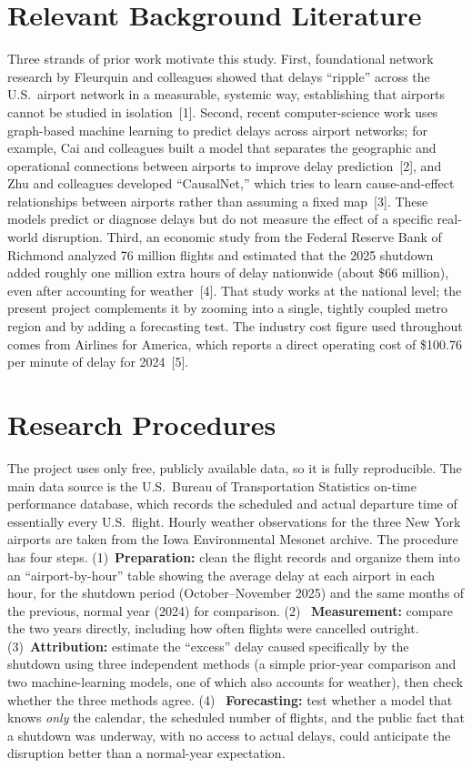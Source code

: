 \documentclass[11pt]{article}
\begin{document}
\section*{Relevant Background Literature}
Three strands of prior work motivate this study. First, foundational network
research by Fleurquin and colleagues showed that delays ``ripple'' across the
U.S.\ airport network in a measurable, systemic way, establishing that airports
cannot be studied in isolation~[1]. Second, recent computer-science work uses
graph-based machine learning to predict delays across airport networks; for
example, Cai and colleagues built a model that separates the geographic and
operational connections between airports to improve delay prediction~[2], and
Zhu and colleagues developed ``CausalNet,'' which tries to learn cause-and-effect
relationships between airports rather than assuming a fixed map~[3]. These models
predict or diagnose delays but do not measure the effect of a specific real-world
disruption. Third, an economic study from the Federal Reserve Bank of Richmond
analyzed 76 million flights and estimated that the 2025 shutdown added roughly
one million extra hours of delay nationwide (about \$66 million), even after
accounting for weather~[4]. That study works at the national level; the present
project complements it by zooming into a single, tightly coupled metro region and
by adding a forecasting test. The industry cost figure used throughout comes from
Airlines for America, which reports a direct operating cost of \$100.76 per
minute of delay for 2024~[5].

\section*{Research Procedures}
The project uses only free, publicly available data, so it is fully reproducible.
The main data source is the U.S.\ Bureau of Transportation Statistics on-time
performance database, which records the scheduled and actual departure time of
essentially every U.S.\ flight. Hourly weather observations for the three New
York airports are taken from the Iowa Environmental Mesonet archive. The
procedure has four steps. (1)~\textbf{Preparation:} clean the flight records and
organize them into an ``airport-by-hour'' table showing the average delay at each
airport in each hour, for the shutdown period (October--November 2025) and the
same months of the previous, normal year (2024) for comparison. (2)~\textbf{
Measurement:} compare the two years directly, including how often flights were
cancelled outright. (3)~\textbf{Attribution:} estimate the ``excess'' delay
caused specifically by the shutdown using three independent methods (a simple
prior-year comparison and two machine-learning models, one of which also accounts
for weather), then check whether the three methods agree. (4)~\textbf{
Forecasting:} test whether a model that knows \emph{only} the calendar, the
scheduled number of flights, and the public fact that a shutdown was underway,
with no access to actual delays, could anticipate the disruption better than a
normal-year expectation.
\end{document}
